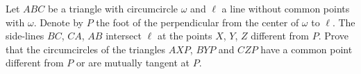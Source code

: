 Let $ABC$ be a triangle with circumcircle $\omega$ and $\ell$ a line without common points with $\omega$. Denote by $P$ the foot of the perpendicular from the center of $\omega$ to $\ell$. The side-lines $BC$, $CA$, $AB$ intersect $\ell$ at the points $X$, $Y$, $Z$ different from $P$. Prove that the circumcircles of the triangles $AXP$, $BYP$ and $CZP$ have a common point different from $P$ or are mutually tangent at $P$.
